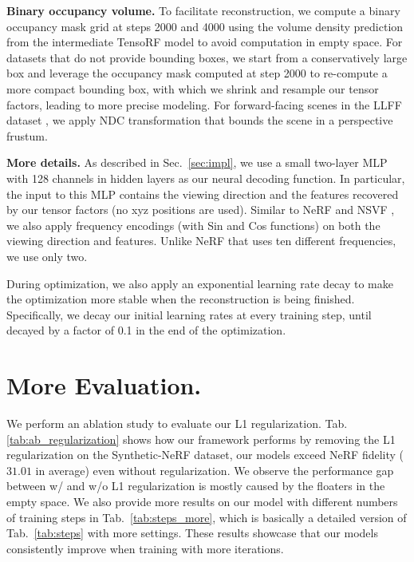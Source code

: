 \documentclass[runningheads]{llncs}
\newcommand{\boldstart}[1]{\noindent\textbf{#1}}
\begin{document}
\boldstart{Binary occupancy volume.}
To facilitate reconstruction, we compute a binary occupancy mask grid at steps 2000 and 4000 using the volume density prediction from the intermediate TensoRF model to avoid computation in empty space.
For datasets that do not provide bounding boxes, we start from a conservatively large box and leverage the occupancy mask computed at step 2000 to re-compute a more compact bounding box, with which we shrink and resample our tensor factors, leading to more precise modeling. For forward-facing scenes in the LLFF dataset \cite{llff}, we apply NDC transformation that bounds the scene in a perspective frustum.
 

\boldstart{More details.}
As described in Sec.~\ref{sec:impl}, we use a small two-layer MLP with 128 channels in hidden layers as our neural decoding function.
In particular, the input to this MLP contains the viewing direction and the features recovered by our tensor factors (no xyz positions are used). Similar to NeRF and NSVF \cite{mildenhall2020nerf,liu2020neural}, we also apply frequency encodings (with Sin and Cos functions) on both the viewing direction and features. Unlike NeRF that uses ten different frequencies, we use only two.


During optimization, we also apply an exponential learning rate decay to make the optimization more stable when the reconstruction is being finished. Specifically, we decay our initial learning rates at every training step, until decayed by a factor of 0.1 in the end of the optimization. 




\section{More Evaluation.}
We perform an ablation study to evaluate our L1 regularization.
Tab. \ref{tab:ab_regularization} shows how our framework performs by removing the L1 regularization on the Synthetic-NeRF dataset, our models exceed NeRF fidelity ($31.01$ in average) even without regularization. 
We observe the performance gap between w/ and w/o L1 regularization is mostly caused by the floaters in the empty space.
We also provide more results on our model with different numbers of training steps in Tab.~\ref{tab:steps_more}, which is basically a detailed version of Tab.~\ref{tab:steps} with more settings.
These results showcase that our models consistently improve when training with more iterations.
\end{document}
